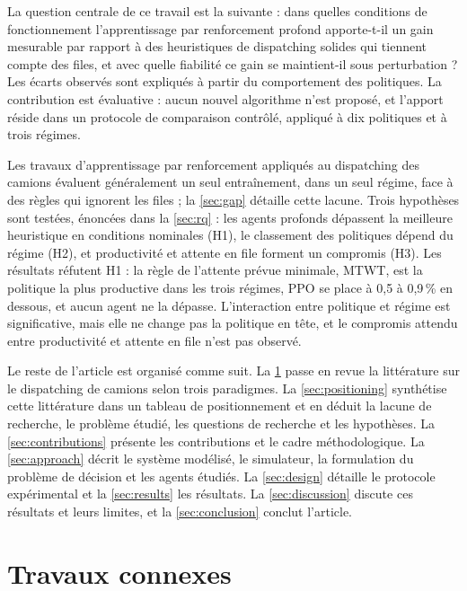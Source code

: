 \documentclass[11pt,a4paper]{article}
\newif\ifrevmarks
\newcommand{\revtag}[1]{\ifrevmarks\textsuperscript{\textcolor{red!70!black}{\scriptsize[#1]}}\fi}
\newcommand{\rev}[2]{\ifrevmarks{\color{revcolor}#2}\revtag{#1}\else#2\fi}
\newenvironment{revbloc}[1]{\par\ifrevmarks\color{revcolor}\noindent\revtag{#1}\ \fi}{\par}
\newif\ifcorrmarks
\newcommand{\corr}[1]{\ifcorrmarks\textcolor{corrcolor}{#1}\else#1\fi}
\begin{document}
\begin{revbloc}{M23, M24}
\corr{La question centrale de ce travail est la suivante : dans quelles conditions de fonctionnement l'apprentissage par renforcement profond apporte-t-il un gain mesurable par rapport à des heuristiques de dispatching solides qui tiennent compte des files, et avec quelle fiabilité ce gain se maintient-il sous perturbation ? Les écarts observés sont expliqués à partir du comportement des politiques.} La contribution est évaluative : aucun nouvel algorithme n'est proposé, et l'apport réside dans un protocole de comparaison contrôlé, appliqué à \rev{T31}{dix politiques} et à trois régimes.

\corr{Les travaux d'apprentissage par renforcement appliqués au dispatching des camions évaluent généralement un seul entraînement, dans un seul régime, face à des règles qui ignorent les files ; la \cref{sec:gap} détaille cette lacune. Trois hypothèses sont testées, énoncées dans la \cref{sec:rq} : les agents profonds dépassent la meilleure heuristique en conditions nominales (H1), le classement des politiques dépend du régime (H2), et productivité et attente en file forment un compromis (H3). Les résultats réfutent H1 : la règle de l'attente prévue minimale, MTWT, est la politique la plus productive dans les trois régimes, PPO se place à 0,5 à 0,9\,\% en dessous, et aucun agent ne la dépasse. L'interaction entre politique et régime est significative, mais elle ne change pas la politique en tête, et le compromis attendu entre productivité et attente en file n'est pas observé.}

Le reste de l'article est organisé comme suit. La \cref{sec:relwork} passe en revue la littérature sur le dispatching de camions selon trois paradigmes. La \cref{sec:positioning} synthétise cette littérature dans un tableau de positionnement et en déduit la lacune de recherche, le problème étudié, les questions de recherche et les hypothèses. La \cref{sec:contributions} présente les contributions et le cadre méthodologique. La \cref{sec:approach} décrit le système modélisé, le simulateur, la formulation du problème de décision et les agents étudiés. La \cref{sec:design} détaille le protocole expérimental et la \cref{sec:results} les résultats. La \cref{sec:discussion} discute ces résultats et leurs limites, et la \cref{sec:conclusion} conclut l'article.
\end{revbloc}



\section{Travaux connexes}
\label{sec:relwork}
\end{document}
